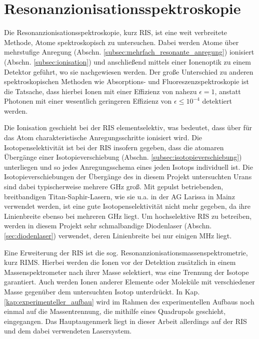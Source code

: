 \section{Resonanzionisationsspektroskopie}\label{sec:ris}
Die Resonanzionisationsspektroskopie, kurz RIS, ist eine weit verbreitete
Methode, Atome spektroskopisch zu untersuchen. Dabei werden Atome über
mehrstufige Anregung (Abschn. \ref{subsec:mehrfach_resonante_anregung})
ionisiert (Abschn. \ref{subsec:ionisation}) und anschließend mittels
einer Ionenoptik zu einem Detektor geführt, wo sie nachgewiesen werden. Der große Unterschied zu anderen spektroskopischen Methoden wie Absorptions- und Fluoreszenzspektroskopie ist die
Tatsache, dass hierbei Ionen mit einer Effizienz von nahezu $\epsilon=1$,
anstatt Photonen mit einer wesentlich geringeren Effizienz von
$\epsilon\leq10^{-4}$ detektiert werden.\par
Die Ionisation geschieht bei der RIS elementselektiv, was bedeutet, dass über
für das Atom charakteristische Anregungsschritte ionisiert wird.
Die Isotopenselektivität ist bei der RIS insofern gegeben, dass die atomaren
Übergänge einer Isotopieverschiebung (Abschn. \ref{subsec:isotopieverschiebung})
unterliegen und so jedes Anregungsschema eines jeden Isotops individuell
ist. Die Isotopieverschiebungen der Übergänge des in diesem Projekt
untersuchten Urans sind dabei typischerweise mehrere
GHz groß. Mit gepulst betriebenden, breitbandigen
Titan-Saphir-Lasern, wie sie u.a. in der AG Larissa in Mainz verwendet werden,
ist eine gute Isotopenselektivität nicht mehr gegeben, da ihre Linienbreite
ebenso bei mehreren GHz liegt. Um hochselektive RIS zu betreiben,
werden in diesem Projekt sehr schmalbandige Diodenlaser
(Abschn. \ref{sec:diodenlaser}) verwendet, deren Linienbreite bei nur einigen
MHz liegt.\par
Eine Erweiterung der RIS ist die sog. Resonanzionisationsmassenspektrometrie,
kurz RIMS. Hierbei werden die Ionen vor der Detektion zusätzlich in einem
Massenspektrometer nach ihrer Masse selektiert, was eine Trennung der Isotope
garantiert. Auch werden Ionen anderer Elemente oder Moleküle mit verschiedener
Masse gegenüber dem untersuchten Isotop unterdrückt. In Kap.
\ref{kap:experimenteller_aufbau} wird im Rahmen des experimentellen Aufbaus noch
einmal auf die Massentrennung, die mithilfe eines Quadrupols geschieht,
eingegangen. Das Hauptaugenmerk liegt in dieser Arbeit allerdings auf der RIS
und dem dabei verwendeten Lasersystem.

